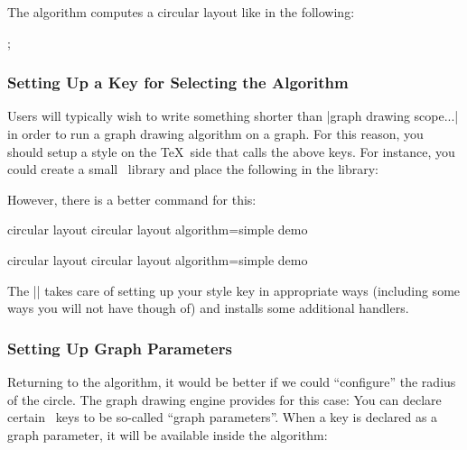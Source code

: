 The algorithm computes a circular layout like in the following:

\begin{codeexample}[]
\tikz [graph drawing scope, /graph drawing/algorithm=simple demo]
  ;
\end{codeexample}


\subsubsection{Setting Up a Key for Selecting the Algorithm}

Users will typically wish to write something shorter than
|graph drawing scope...| in order to run a graph drawing algorithm on
a graph. For this reason, you should setup a style on the \TeX\ side
that calls the above keys. For instance, you could create a small
\tikzname\ library and place the following in the library:

\begin{codeexample}
\end{codeexample}

However, there is a better command for this:

\begin{codeexample}[code only]
\pgfgddeclarealgorithmkey
{circular layout}
{circular layout}
{algorithm=simple demo}
\end{codeexample}
\pgfgddeclarealgorithmkey
{circular layout}
{circular layout}
{algorithm=simple demo}

The |\pgfgddeclarealgorithmkey| takes care of setting up your style
key in appropriate ways (including some ways you will not have though
of) and installs some additional handlers.

\subsubsection{Setting Up Graph Parameters}

Returning to the algorithm, it would be better if we could
``configure'' the radius of the circle. The graph drawing engine
provides for this case: You can declare certain \pgfname\ keys to be
so-called ``graph parameters''. When a key is declared as a graph
parameter, it will be available inside the algorithm: 

